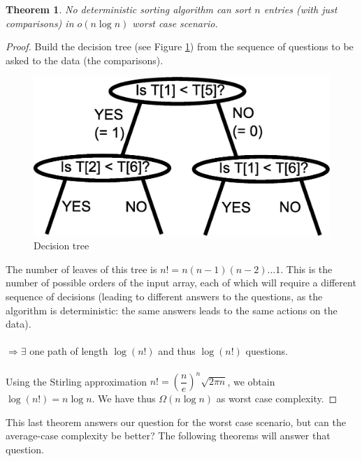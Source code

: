 \documentclass[11pt,a4paper]{article}
\newtheorem{theorem}{Theorem}
\begin{document}
\begin{theorem}
No deterministic sorting algorithm can sort $n$ entries (with just comparisons) in $o(n\log n)$ worst case scenario.
\end{theorem}
\begin{proof}
Build the decision tree (see Figure \ref{tree7}) from the sequence of questions to be asked to the data (the comparisons).
\begin{figure}[htbp]
\centering
\includegraphics[scale=0.5]{inkscape/tree7.eps}
\caption{Decision tree}
\label{tree7}
\end{figure}
The number of leaves of this tree is $n! = n(n-1)(n-2)...1$. This is the number of possible orders of the input array, each of which will require a different sequence of decisions (leading to different answers to the questions, as the algorithm is deterministic: the same answers leads to the same actions on the data). \\ \\
$\Rightarrow \exists$ one path of length $\log (n!)$ and thus $\log(n!)$ questions. \\ \\
Using the Stirling approximation $n! = \left( \dfrac{n}{e} \right)^n \sqrt{2\pi n}$, we obtain $\log (n!) = n \log n$. We have thus $\Omega (n \log n)$ as worst case complexity.
\end{proof}

This last theorem answers our question for the worst case scenario, but can the average-case complexity be better? The following theorems will answer that question.
\end{document}
